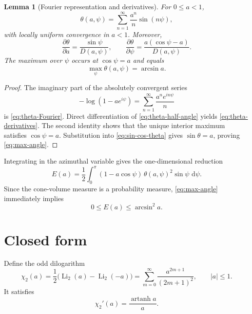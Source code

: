 \documentclass[11pt]{article}
\newtheorem{lemma}[theorem]{Lemma}
\theoremstyle{definition}
\newcommand{\Li}{\operatorname{Li}}
\newcommand{\atanh}{\operatorname{artanh}}
\newcommand{\dd}{\,\mathrm{d}}
\begin{document}
\begin{lemma}[Fourier representation and derivatives]
For $0\leq a<1$,
\begin{equation}
\theta(a,\psi)
=
\sum_{n=1}^{\infty}\frac{a^n}{n}\sin(n\psi),
\label{eq:theta-Fourier}
\end{equation}
with locally uniform convergence in $a<1$.  Moreover,
\begin{equation}
\frac{\partial\theta}{\partial a}
=
\frac{\sin\psi}{D(a,\psi)},
\qquad
\frac{\partial\theta}{\partial\psi}
=
\frac{a(\cos\psi-a)}{D(a,\psi)}.
\label{eq:theta-derivatives}
\end{equation}
The maximum over $\psi$ occurs at $\cos\psi=a$ and equals
\begin{equation}
\max_{\psi}\theta(a,\psi)=\arcsin a.
\label{eq:max-angle}
\end{equation}
\end{lemma}

\begin{proof}
The imaginary part of the absolutely convergent series
\[
-\log(1-ae^{i\psi})
=
\sum_{n=1}^{\infty}\frac{a^n e^{in\psi}}{n}
\]
is \eqref{eq:theta-Fourier}.  Direct differentiation of \eqref{eq:theta-half-angle} yields \eqref{eq:theta-derivatives}.  The second identity shows that the unique interior maximum satisfies $\cos\psi=a$.  Substitution into \eqref{eq:sin-cos-theta} gives $\sin\theta=a$, proving \eqref{eq:max-angle}.
\end{proof}

Integrating in the azimuthal variable gives the one-dimensional reduction
\begin{equation}
E(a)
=
\frac12\int_0^\pi
(1-a\cos\psi)\,\theta(a,\psi)^2\sin\psi\,\dd\psi.
\label{eq:E-reduced}
\end{equation}
Since the cone-volume measure is a probability measure, \eqref{eq:max-angle} immediately implies
\begin{equation}
0\leq E(a)\leq\arcsin^2 a.
\label{eq:rough-bound}
\end{equation}

\section{Closed form}

Define the odd dilogarithm
\begin{equation}
\chi_2(a)
=
\frac12\bigl(\Li_2(a)-\Li_2(-a)\bigr)
=
\sum_{m=0}^{\infty}\frac{a^{2m+1}}{(2m+1)^2},
\qquad |a|\leq1.
\label{eq:chi2}
\end{equation}
It satisfies
\begin{equation}
\chi_2'(a)=\frac{\atanh a}{a}.
\label{eq:chi-derivative}
\end{equation}
\end{document}
